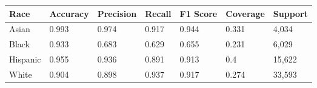 \begin{tabular}{lllllll}
\toprule
Race & Accuracy & Precision & Recall & F1 Score & Coverage & Support \\
\midrule
Asian & 0.993 & 0.974 & 0.917 & 0.944 & 0.331 & 4,034 \\
Black & 0.933 & 0.683 & 0.629 & 0.655 & 0.231 & 6,029 \\
Hispanic & 0.955 & 0.936 & 0.891 & 0.913 & 0.4 & 15,622 \\
White & 0.904 & 0.898 & 0.937 & 0.917 & 0.274 & 33,593 \\
\bottomrule
\end{tabular}
